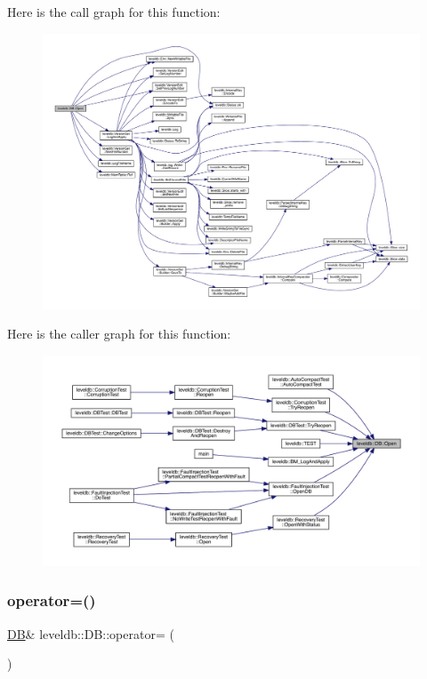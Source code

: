 Here is the call graph for this function\+:
\nopagebreak
\begin{figure}[H]
\begin{center}
\leavevmode
\includegraphics[width=350pt]{classleveldb_1_1_d_b_ac1da2b48e911287d86f3a3bfa0f851fe_cgraph}
\end{center}
\end{figure}
Here is the caller graph for this function\+:
\nopagebreak
\begin{figure}[H]
\begin{center}
\leavevmode
\includegraphics[width=350pt]{classleveldb_1_1_d_b_ac1da2b48e911287d86f3a3bfa0f851fe_icgraph}
\end{center}
\end{figure}
\mbox{\label{classleveldb_1_1_d_b_a556cd1a16e1abb8f7f6cbe1f8b843097}} 
\subsubsection{\texorpdfstring{operator=()}{operator=()}}
{\footnotesize\ttfamily \mbox{\hyperlink{classleveldb_1_1_d_b}{DB}}\& leveldb\+::\+D\+B\+::operator= (\begin{DoxyParamCaption}\item[{const \mbox{\hyperlink{classleveldb_1_1_d_b}{DB}} \&}]{ }\end{DoxyParamCaption})\hspace{0.3cm}{\ttfamily [delete]}}

